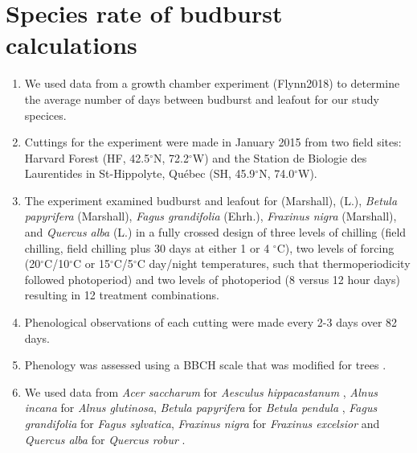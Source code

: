 \documentclass{article}\usepackage[]{graphicx}\usepackage[]{color}
\begin{document}
\section*{Species rate of budburst calculations}
\begin{enumerate}
\item We used data from a growth chamber experiment (Flynn2018) to determine the average number of days between budburst and leafout for our study specices. 
\item Cuttings for the experiment were made in January 2015 from two field sites: Harvard Forest (HF, 42.5$^{\circ}$N, 72.2$^{\circ}$W) and the Station de Biologie des Laurentides in St-Hippolyte, Qu\'ebec (SH, 45.9$^{\circ}$N, 74.0$^{\circ}$W). 
\item The experiment examined budburst and leafout for  (Marshall),  (L.), \textit{Betula papyrifera} (Marshall), \textit{Fagus grandifolia} (Ehrh.), \textit{Fraxinus nigra} (Marshall), and \textit{Quercus alba} (L.) in a fully crossed design of three levels of chilling (field chilling, field chilling plus 30 days at either 1 or 4 $^{\circ}$C), two levels of forcing (20$^{\circ}$C/10$^{\circ}$C or 15$^{\circ}$C/5$^{\circ}$C day/night temperatures, such that thermoperiodicity followed photoperiod) and two levels of photoperiod (8 versus 12 hour days) resulting in 12 treatment combinations. 
\item Phenological observations of each cutting were made every 2-3 days over 82 days. 
\item Phenology was assessed using a BBCH scale that was modified for trees \citep{Finn2007}. 
\item We used data from \textit{Acer saccharum} for \textit{Aesculus hippacastanum} \citep{Buerki2010}, \textit{Alnus incana} for \textit{Alnus glutinosa}, \textit{Betula papyrifera} for \textit{Betula pendula} \citep{Wang2016}, \textit{Fagus grandifolia} for \textit{Fagus sylvatica}, \textit{Fraxinus nigra} for \textit{Fraxinus excelsior} and \textit{Quercus alba} for \textit{Quercus robur} \citep{Hipp2017}.
\end{enumerate}
\end{document}
